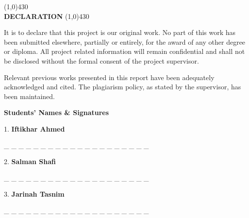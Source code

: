 \begin{titlepage}

\begin{center}
\line(1,0){430}\\
{\Huge \bf DECLARATION}
\line(1,0){430}
\end{center}

\vfill

\begin{center}
It is to declare that this project is our original work. No part of this work has been
submitted elsewhere, partially or entirely, for the award of any other degree or diploma.
All project related information will remain confidential and shall not be disclosed
without the formal consent of the project supervisor.

\vspace{1em}

Relevant previous works presented in this report have been adequately acknowledged
and cited. The plagiarism policy, as stated by the supervisor, has been maintained.
\end{center}

\vfill
\vfill

\begin{flushleft}
\textbf{Students’ Names \& Signatures}
\end{flushleft}

\vspace{1.5em}

\begin{flushleft}
1. \textbf{Iftikhar Ahmed}

\vspace{1em}
\noindent\_ \_ \_ \_ \_ \_ \_ \_ \_ \_ \_ \_ \_ \_ \_ \_ \_ \_ \_ \_

\vspace{2em}

2. \textbf{Salman Shafi}

\vspace{1em}
\noindent\_ \_ \_ \_ \_ \_ \_ \_ \_ \_ \_ \_ \_ \_ \_ \_ \_ \_ \_ \_

\vspace{2em}

3. \textbf{Jarinah Tasnim}

\vspace{1em}
\noindent\_ \_ \_ \_ \_ \_ \_ \_ \_ \_ \_ \_ \_ \_ \_ \_ \_ \_ \_ \_
\end{flushleft}

\vfill

\end{titlepage}

